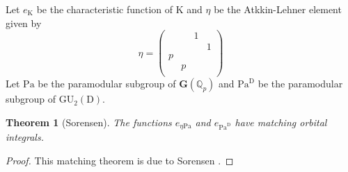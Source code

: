 \documentclass[10pt]{amsart}
\numberwithin{equation}{section}
\newtheorem{theorem}[equation]{Theorem}
\theoremstyle{definition}
\def\GU{\mathrm{GU}}
\def\Pa{\mathrm{Pa}}
\def\bfG{\mathbf{G}}
\def\QQ{\mathbb{Q}}
\def\rmD{\mathrm{D}}
\def\rmK{\mathrm{K}}
\begin{document}
Let $e_{\rmK}$ be the characteristic function of $\rmK$ and $\eta$ be the Atkkin-Lehner element given by
\begin{equation*}
\eta=\begin{pmatrix}&&1&\\ &&&1\\ p&&&\\ &p&&\\ \end{pmatrix}
\end{equation*}
Let $\Pa$ be the paramodular subgroup of $\bfG(\QQ_{p})$ and $\Pa^{\rmD}$ be the paramodular subgroup of $\GU_{2}(\rmD)$. 
\begin{theorem}[Sorensen]\label{matching}
The functions $e_{\eta\Pa}$ and $e_{\Pa^{\rmD}}$ have matching orbital integrals.
\end{theorem}
\begin{proof}
This matching theorem is due to Sorensen \cite[Theorem 3.2]{Sor-level-raising}.
\end{proof}
\end{document}
